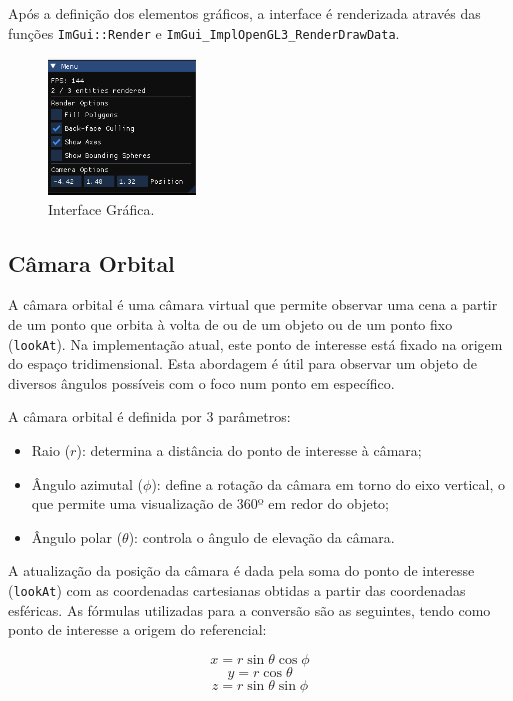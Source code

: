 \documentclass[12pt, a4paper]{article}
\begin{document}
Após a definição dos elementos gráficos, a interface é renderizada através das funções
\texttt{ImGui::Render} e \texttt{ImGui\_ImplOpenGL3\_RenderDrawData}.

\begin{figure}[H]
    \centering
    \includegraphics[width=0.35\textwidth]{res/phase2/UI.png}
    \caption{Interface Gráfica.}
\end{figure}

\subsection{Câmara Orbital}

A câmara orbital é uma câmara virtual que permite observar uma cena a partir de um ponto que orbita
à volta de ou de um objeto ou de um ponto fixo (\texttt{lookAt}). Na implementação atual, este ponto
de interesse está fixado na origem do espaço tridimensional. Esta abordagem é útil para observar um
objeto de diversos ângulos possíveis com o foco num ponto em específico.

A câmara orbital é definida por 3 parâmetros:

\begin{itemize}
    \item Raio ($r$): determina a distância do ponto de interesse à câmara;
    \item Ângulo azimutal ($\phi$): define a rotação da câmara em torno do eixo vertical,
    o que permite uma visualização de 360º em redor do objeto;
    \item Ângulo polar ($\theta$): controla o ângulo de elevação da câmara.
\end{itemize}

A atualização da posição da câmara é dada pela soma do ponto de interesse (\texttt{lookAt}) com
as coordenadas cartesianas obtidas a partir das coordenadas esféricas. As fórmulas utilizadas para
a conversão são as seguintes, tendo como ponto de interesse a origem do referencial:

$$x = r \sin \theta \cos \phi$$
$$y = r \cos \theta$$
$$z = r \sin \theta \sin \phi$$
\end{document}
